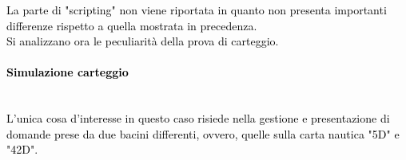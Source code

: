 \textcolor{black}{La parte di "scripting" non viene riportata in quanto non presenta importanti differenze rispetto a quella mostrata in precedenza.}\\

\textcolor{black}{Si analizzano ora le peculiarità della prova di carteggio.}\\

\paragraph{\textcolor{black}{Simulazione carteggio}}\leavevmode\\

\textcolor{black}{L'unica cosa d'interesse in questo caso risiede nella gestione e presentazione di domande prese da due bacini differenti, ovvero, quelle sulla carta nautica "5D" e "42D".}\\ 

